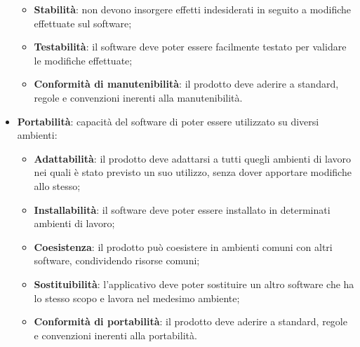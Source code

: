 \begin{itemize}
\begin{itemize}
\item\textbf{Stabilità}: non devono insorgere effetti indesiderati in seguito a modifiche effettuate sul software;
\item\textbf{Testabilità}: il software deve poter essere facilmente testato per validare le modifiche effettuate;
\item\textbf{Conformità di manutenibilità}: il prodotto deve aderire a standard, regole e convenzioni inerenti alla manutenibilità.
\end{itemize}
\item\textbf{Portabilità}: capacità del software di poter essere utilizzato su diversi ambienti:
\begin{itemize}
\item\textbf{Adattabilità}: il prodotto deve adattarsi a tutti quegli ambienti di lavoro nei quali è stato previsto un suo utilizzo, senza dover apportare modifiche allo stesso;
\item\textbf{Installabilità}: il software deve poter essere installato in determinati ambienti di lavoro;
\item\textbf{Coesistenza}: il prodotto può coesistere in ambienti comuni
con altri software, condividendo risorse comuni;
\item\textbf{Sostituibilità}: l'applicativo deve poter sostituire un altro software che ha lo stesso scopo e lavora nel medesimo ambiente;
\item\textbf{Conformità di portabilità}: il prodotto deve aderire a standard, regole e convenzioni inerenti alla portabilità.
\end{itemize}
\end{itemize}	